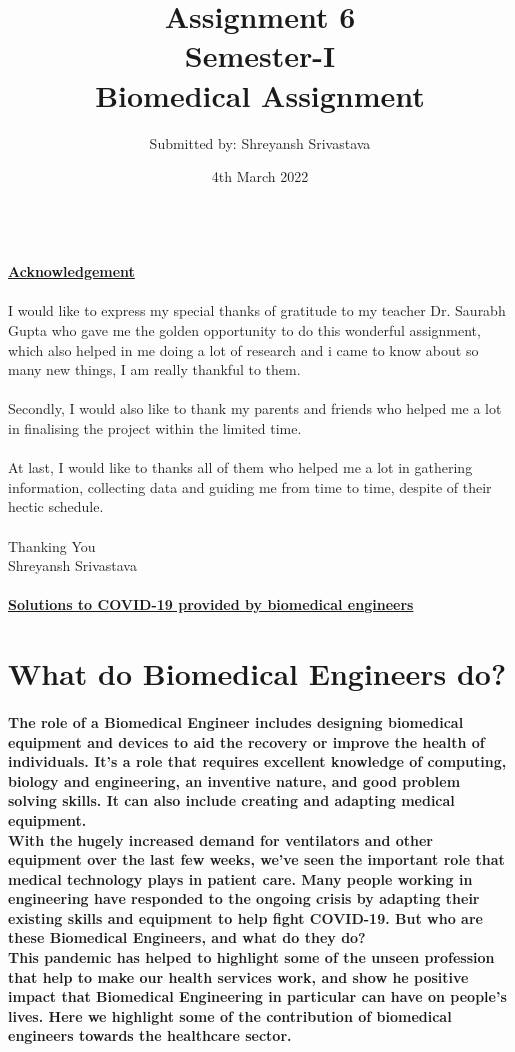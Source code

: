 \documentclass{article}
\title{Assignment 6\\
Semester-I\\
Biomedical Assignment}
\author{Submitted by: Shreyansh Srivastava}
\date{4th March 2022}
\begin{document}
	\maketitle
	\clearpage
	\begin{Acknowledgement}
		\\\Huge{\textbf{\underline{Acknowledgement}}}\\
		\\\large I would like to express my special thanks of gratitude to my teacher Dr. Saurabh Gupta who gave me the golden opportunity to do this wonderful assignment, which also helped in me doing a lot of research and i came to know about so many new things, I am really thankful to them.\\\\
		Secondly, I would also like to thank my parents and friends who helped me a lot in finalising the project within the limited time.\\\\
		At last, I would like to thanks all of them who helped me a lot in gathering information, collecting data and guiding me from time to time, despite of their hectic schedule.\\\\
		Thanking You\\
		Shreyansh Srivastava
	\end{Acknowledgement}
	\clearpage
	\paragraph{\Large \textbf{\centering \underline{Solutions to COVID-19 provided by biomedical engineers}}}
	\section{\Large \textbf{What do Biomedical Engineers do?}}
	\paragraph{The role of a Biomedical Engineer includes designing biomedical equipment and devices to aid the recovery or improve the health of individuals. It’s a role that requires excellent knowledge of computing, biology and engineering, an inventive nature, and good problem solving skills. It can also include creating and adapting medical equipment.\\
	With the hugely increased demand for ventilators and other equipment over the last few weeks, we’ve seen the important role that medical technology plays in patient care. Many people working in engineering have responded to the ongoing crisis by adapting their existing skills and equipment to help fight COVID-19.  But who are these Biomedical Engineers, and what do they do?\\
	This pandemic has helped to highlight some of the unseen profession that help to make our health services work, and show he positive impact that Biomedical Engineering in particular can have on people's lives. Here we highlight some of the contribution of biomedical engineers towards the healthcare sector.\\\\}
\end{document}
